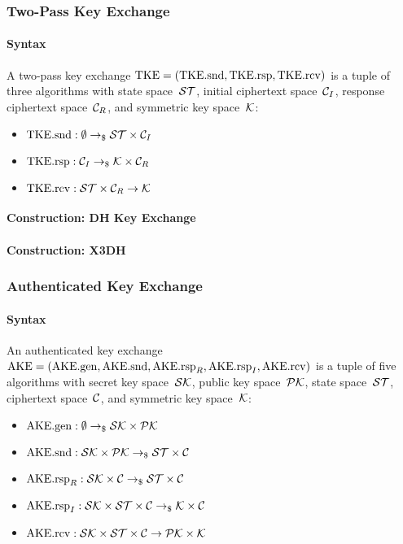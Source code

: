 \documentclass[a4paper,orivec]{llncs}
\begin{document}
\subsubsection{Two-Pass Key Exchange}

\paragraph{Syntax}
A two-pass key exchange $\mathrm{TKE}=(\mathrm{TKE}.\mathrm{snd},\mathrm{TKE}.\mathrm{rsp},\mathrm{TKE}.\mathrm{rcv})$ is a tuple of three algorithms with state space~$\mathcal{ST}$, initial ciphertext space~$\mathcal{C}_I$, response ciphertext space~$\mathcal{C}_R$, and symmetric key space~$\mathcal{K}$:

\begin{itemize}
    \item $\mathrm{TKE}.\mathrm{snd}: \emptyset \to_\$ \mathcal{ST}\times\mathcal{C}_I$
    \item $\mathrm{TKE}.\mathrm{rsp}: \mathcal{C}_I \to_\$ \mathcal{K}\times\mathcal{C}_R$
    \item $\mathrm{TKE}.\mathrm{rcv}: \mathcal{ST}\times\mathcal{C}_R \to \mathcal{K}$
\end{itemize}

\paragraph{Construction: DH Key Exchange}

\paragraph{Construction: X3DH}

\subsubsection{Authenticated Key Exchange}

\paragraph{Syntax}
An authenticated key exchange $\mathrm{AKE}=(\mathrm{AKE}.\mathrm{gen},\allowbreak\mathrm{AKE}.\mathrm{snd},\allowbreak\mathrm{AKE}.\mathrm{rsp}_R,\allowbreak\mathrm{AKE}.\mathrm{rsp}_I,\allowbreak\mathrm{AKE}.\mathrm{rcv})$ is a tuple of five algorithms with secret key space~$\mathcal{SK}$, public key space~$\mathcal{PK}$, state space~$\mathcal{ST}$, ciphertext space~$\mathcal{C}$, and symmetric key space~$\mathcal{K}$:

\begin{itemize}
    \item $\mathrm{AKE}.\mathrm{gen}: \emptyset \to_\$ \mathcal{SK}\times\mathcal{PK}$
    \item $\mathrm{AKE}.\mathrm{snd}: \mathcal{SK}\times\mathcal{PK} \to_\$ \mathcal{ST}\times\mathcal{C}$
    \item $\mathrm{AKE}.\mathrm{rsp}_R: \mathcal{SK}\times\mathcal{C} \to_\$ \mathcal{ST}\times\mathcal{C}$
    \item $\mathrm{AKE}.\mathrm{rsp}_I: \mathcal{SK}\times\mathcal{ST}\times\mathcal{C} \to_\$ \mathcal{K}\times\mathcal{C}$
    \item $\mathrm{AKE}.\mathrm{rcv}: \mathcal{SK}\times\mathcal{ST}\times\mathcal{C} \to \mathcal{PK}\times\mathcal{K}$
\end{itemize}
\end{document}
